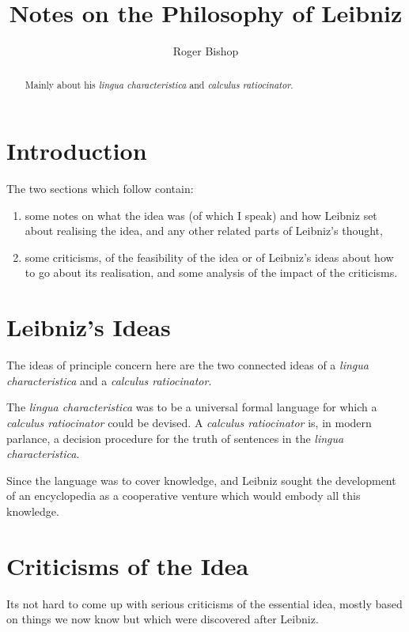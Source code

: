 \documentclass{rbjk}
\begin{document}
                                                                                   
\begin{article}
\begin{opening}  

\title{Notes on the Philosophy of Leibniz}
\author{Roger Bishop }

\begin{abstract}
Mainly about his {\it lingua characteristica} and {\it calculus ratiocinator}.
\end{abstract}
\end{opening}

\tableofcontents

\section{Introduction}

The two sections which follow contain:

\begin{enumerate}
\item some notes on what the idea was (of which I speak) and how Leibniz set about realising the idea, and any other related parts of Leibniz's thought,
\item some criticisms, of the feasibility of the idea or of Leibniz's ideas about how to go about its realisation, and some analysis of the impact of the criticisms.
\end{enumerate}

\section{Leibniz's Ideas}

The ideas of principle concern here are the two connected ideas of a {\it lingua characteristica} and a {\it calculus ratiocinator}.

The {\it lingua characteristica} was to be a universal formal language for which a {\it calculus ratiocinator} could be devised.
A {\it calculus ratiocinator} is, in modern parlance, a decision procedure for the truth of sentences in the {\it lingua characteristica}.

Since the language was to cover knowledge, and Leibniz sought the development of an encyclopedia as a cooperative venture which would embody all this knowledge.

\section{Criticisms of the Idea}
Its not hard to come up with serious criticisms of the essential idea, mostly based on things we now know but which were discovered after Leibniz.


\end{article}
\end{document}
